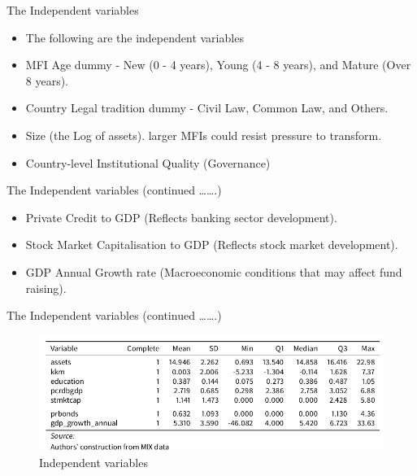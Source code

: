 \documentclass[
  ignorenonframetext,
]{beamer}
\providecommand{\tightlist}{%
  \setlength{\itemsep}{0pt}\setlength{\parskip}{0pt}}
\begin{document}
\begin{frame}{The Independent variables}
\protect\hypertarget{the-independent-variables}{}
\begin{itemize}
\tightlist
\item
  The following are the independent variables
\item
  MFI Age dummy - New (0 - 4 years), Young (4 - 8 years), and Mature
  (Over 8 years).
\item
  Country Legal tradition dummy - Civil Law, Common Law, and Others.
\item
  Size (the Log of assets). larger MFIs could resist pressure to
  transform.
\item
  Country-level Institutional Quality (Governance)
\end{itemize}
\end{frame}

\begin{frame}{The Independent variables (continued \ldots\ldots.)}
\protect\hypertarget{the-independent-variables-continued-.}{}
\begin{itemize}
\tightlist
\item
  Private Credit to GDP (Reflects banking sector development).
\item
  Stock Market Capitalisation to GDP (Reflects stock market
  development).
\item
  GDP Annual Growth rate (Macroeconomic conditions that may affect fund
  raising).
\end{itemize}
\end{frame}

\begin{frame}{The Independent variables (continued \ldots\ldots.)}
\protect\hypertarget{the-independent-variables-continued-.-1}{}
\begin{figure}
\centering
\includegraphics{presentation_shot3.png}
\caption{Independent variables}
\end{figure}
\end{frame}
\end{document}
